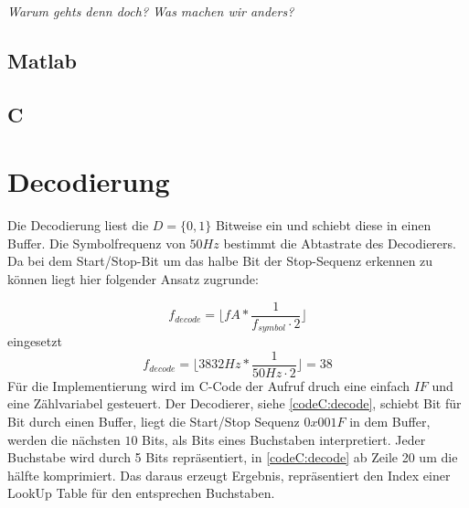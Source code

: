 \documentclass{article}
\begin{document}
\textit{Warum gehts denn doch? Was machen wir anders?}
\subsection{Matlab}

\subsection{C}

\section{Decodierung}

Die Decodierung liest die $D = \{0,1\}$ Bitweise ein und schiebt diese in einen Buffer. 
Die Symbolfrequenz von $50Hz$ bestimmt die Abtastrate des Decodierers. Da bei dem Start/Stop-Bit um das
halbe Bit der Stop-Sequenz erkennen zu können liegt hier folgender Ansatz zugrunde:

$$
f_{decode} = \lfloor fA * \frac{1}{f_{symbol} \cdot 2}\rfloor 
$$
eingesetzt
$$
f_{decode} = \lfloor 3832Hz * \frac{1}{50Hz\cdot 2}\rfloor = 38
$$
Für die Implementierung wird im C-Code der Aufruf druch eine einfach $IF$ und eine Zählvariabel
gesteuert. Der Decodierer, siehe \ref{codeC:decode}, schiebt Bit für Bit durch einen Buffer, liegt
die Start/Stop Sequenz $0x001F$ in dem Buffer, werden die nächsten $10$ Bits, als Bits eines Buchstaben interpretiert.
Jeder Buchstabe wird durch 5 Bits repräsentiert, in \ref{codeC:decode} ab Zeile 20 um die hälfte komprimiert.
Das daraus erzeugt Ergebnis, repräsentiert den Index einer LookUp Table für den entsprechen Buchstaben.
\end{document}
